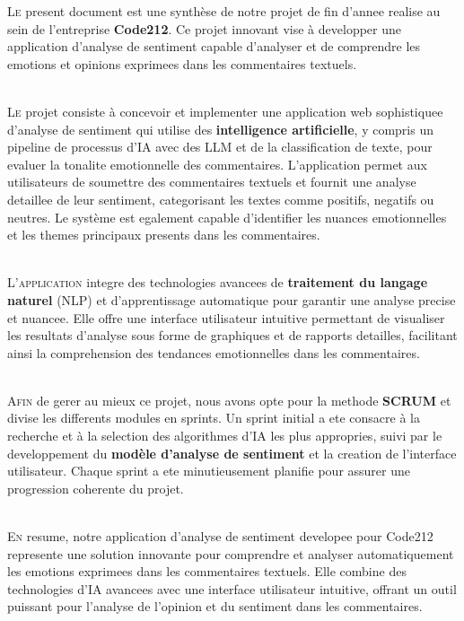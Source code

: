
\lettrine[nindent=0em, slope=.5em] {\color{Eblue}L}{e} present document est une synthèse de notre projet de fin d'annee realise au sein de l'entreprise \textbf{Code212}. Ce projet innovant vise à developper une application d'analyse de sentiment capable d'analyser et de comprendre les emotions et opinions exprimees dans les commentaires textuels.

\ \\

\lettrine[nindent=0em, slope=.5em] {\color{Eblue}L}{e} projet consiste à concevoir et implementer une application web sophistiquee d'analyse de sentiment qui utilise des \textbf{intelligence artificielle}, y compris un pipeline de processus d'IA avec des LLM et de la classification de texte, pour evaluer la tonalite emotionnelle des commentaires. L'application permet aux utilisateurs de soumettre des commentaires textuels et fournit une analyse detaillee de leur sentiment, categorisant les textes comme positifs, negatifs ou neutres. Le système est egalement capable d'identifier les nuances emotionnelles et les themes principaux presents dans les commentaires.

\ \\

\lettrine[nindent=0em, slope=.5em] {\color{Eblue}L}{'application} integre des technologies avancees de \textbf{traitement du langage naturel} (NLP) et d'apprentissage automatique pour garantir une analyse precise et nuancee. Elle offre une interface utilisateur intuitive permettant de visualiser les resultats d'analyse sous forme de graphiques et de rapports detailles, facilitant ainsi la comprehension des tendances emotionnelles dans les commentaires.

\ \\

\lettrine[nindent=0em, slope=.5em] {\color{Eblue}A}{fin} de gerer au mieux ce projet, nous avons opte pour la methode \textbf{SCRUM} et divise les differents modules en sprints. Un sprint initial a ete consacre à la recherche et à la selection des algorithmes d'IA les plus appropries, suivi par le developpement du \textbf{modèle d'analyse de sentiment} et la creation de l'interface utilisateur. Chaque sprint a ete minutieusement planifie pour assurer une progression coherente du projet.

\ \\

\lettrine[nindent=0em, slope=.5em] {\color{Eblue}E}{n} resume, notre application d'analyse de sentiment developee pour Code212 represente une solution innovante pour comprendre et analyser automatiquement les emotions exprimees dans les commentaires textuels. Elle combine des technologies d'IA avancees avec une interface utilisateur intuitive, offrant un outil puissant pour l'analyse de l'opinion et du sentiment dans les commentaires.
